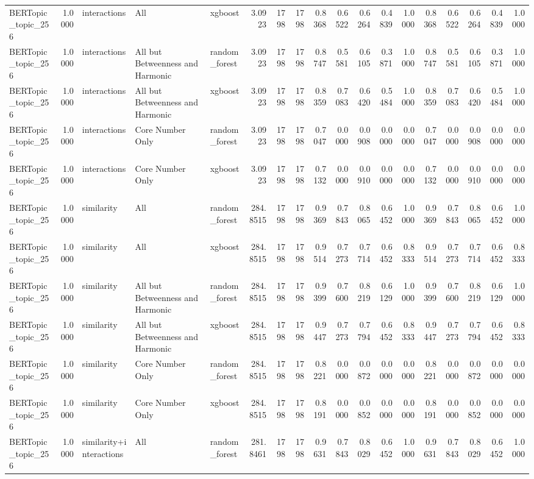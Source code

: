 \begin{tabular}{lrlllrrrrrrrrrrrrr}
BERTopic_topic_256 & 1.0000 & interactions & All & xgboost & 3.0923 & 1798 & 1798 & 0.8368 & 0.6522 & 0.6264 & 0.4839 & 1.0000 & 0.8368 & 0.6522 & 0.6264 & 0.4839 & 1.0000 \\
BERTopic_topic_256 & 1.0000 & interactions & All but Betweenness and Harmonic & random_forest & 3.0923 & 1798 & 1798 & 0.8747 & 0.5581 & 0.6105 & 0.3871 & 1.0000 & 0.8747 & 0.5581 & 0.6105 & 0.3871 & 1.0000 \\
BERTopic_topic_256 & 1.0000 & interactions & All but Betweenness and Harmonic & xgboost & 3.0923 & 1798 & 1798 & 0.8359 & 0.7083 & 0.6420 & 0.5484 & 1.0000 & 0.8359 & 0.7083 & 0.6420 & 0.5484 & 1.0000 \\
BERTopic_topic_256 & 1.0000 & interactions & Core Number Only & random_forest & 3.0923 & 1798 & 1798 & 0.7047 & 0.0000 & 0.0908 & 0.0000 & 0.0000 & 0.7047 & 0.0000 & 0.0908 & 0.0000 & 0.0000 \\
BERTopic_topic_256 & 1.0000 & interactions & Core Number Only & xgboost & 3.0923 & 1798 & 1798 & 0.7132 & 0.0000 & 0.0910 & 0.0000 & 0.0000 & 0.7132 & 0.0000 & 0.0910 & 0.0000 & 0.0000 \\
BERTopic_topic_256 & 1.0000 & similarity & All & random_forest & 284.8515 & 1798 & 1798 & 0.9369 & 0.7843 & 0.8065 & 0.6452 & 1.0000 & 0.9369 & 0.7843 & 0.8065 & 0.6452 & 1.0000 \\
BERTopic_topic_256 & 1.0000 & similarity & All & xgboost & 284.8515 & 1798 & 1798 & 0.9514 & 0.7273 & 0.7714 & 0.6452 & 0.8333 & 0.9514 & 0.7273 & 0.7714 & 0.6452 & 0.8333 \\
BERTopic_topic_256 & 1.0000 & similarity & All but Betweenness and Harmonic & random_forest & 284.8515 & 1798 & 1798 & 0.9399 & 0.7600 & 0.8219 & 0.6129 & 1.0000 & 0.9399 & 0.7600 & 0.8219 & 0.6129 & 1.0000 \\
BERTopic_topic_256 & 1.0000 & similarity & All but Betweenness and Harmonic & xgboost & 284.8515 & 1798 & 1798 & 0.9447 & 0.7273 & 0.7794 & 0.6452 & 0.8333 & 0.9447 & 0.7273 & 0.7794 & 0.6452 & 0.8333 \\
BERTopic_topic_256 & 1.0000 & similarity & Core Number Only & random_forest & 284.8515 & 1798 & 1798 & 0.8221 & 0.0000 & 0.0872 & 0.0000 & 0.0000 & 0.8221 & 0.0000 & 0.0872 & 0.0000 & 0.0000 \\
BERTopic_topic_256 & 1.0000 & similarity & Core Number Only & xgboost & 284.8515 & 1798 & 1798 & 0.8191 & 0.0000 & 0.0852 & 0.0000 & 0.0000 & 0.8191 & 0.0000 & 0.0852 & 0.0000 & 0.0000 \\
BERTopic_topic_256 & 1.0000 & similarity+interactions & All & random_forest & 281.8461 & 1798 & 1798 & 0.9631 & 0.7843 & 0.8029 & 0.6452 & 1.0000 & 0.9631 & 0.7843 & 0.8029 & 0.6452 & 1.0000 \\

\end{tabular}
